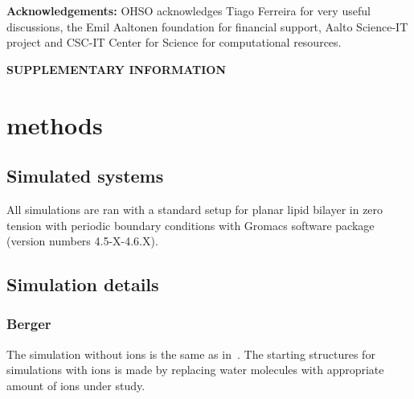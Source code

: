 \documentclass[pre,aps,floatfix,authordate1-4,twocolumn]{revtex4-1}
\begin{document}
{\bf Acknowledgements: }
OHSO acknowledges Tiago Ferreira for very useful discussions, the Emil Aaltonen foundation for financial support, Aalto Science-IT project and CSC-IT Center for Science for computational resources. 


\newpage

\appendix
\begin{center}
{\bf SUPPLEMENTARY INFORMATION}
\end{center}

\section{methods}

\subsection{Simulated systems}
All simulations are ran with a standard setup for planar lipid bilayer in zero tension
with periodic boundary conditions with Gromacs software package (version numbers 4.5-X-4.6.X).





\subsection{Simulation details}
\subsubsection{Berger}
The simulation without ions is the same as in~\cite{botan15}. The starting structures for simulations with ions is
made by replacing water molecules with appropriate amount of ions under study.
\end{document}
